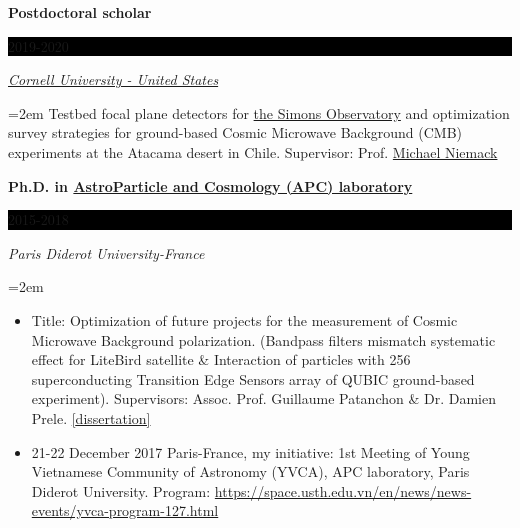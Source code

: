 \documentclass[paper=a4,fontsize=11pt]{scrartcl} %
\newcommand{\sepspace}{\vspace*{1em}}		%
\newcommand{\EducationEntry}[4]{
		\noindent \textbf{#1} \hfill      %
		\colorbox{Black}{%
			\parbox{6em}{%
			\hfill\color{White}#2}} \par  %
		\noindent \textit{#3} \par        %
		\noindent\hangindent=2em\hangafter=0 \small #4 %
		\normalsize \par}
\begin{document}
\sepspace


\EducationEntry{Postdoctoral scholar}{2019-2020}{ \href{https://www.cornell.edu/}{Cornell University - United States} }{ 
Testbed focal plane detectors for \href{https://simonsobservatory.org/}{the Simons Observatory} and optimization survey strategies for ground-based Cosmic Microwave Background (CMB) experiments at the Atacama desert in Chile. Supervisor: Prof. \href{https://www.classe.cornell.edu/~mdn49/}{Michael Niemack} }
\sepspace

\EducationEntry{Ph.D. in \href{http://www.apc.univ-paris7.fr/APC_CS/en}{AstroParticle and Cosmology (APC) laboratory} }{2015-2018}{Paris Diderot University-France}{
\begin{itemize}
    \item Title: Optimization of future projects for the measurement of Cosmic Microwave Background polarization. (Bandpass filters mismatch systematic effect for LiteBird satellite \& Interaction of particles with 256 superconducting Transition Edge Sensors array of QUBIC ground-based experiment). Supervisors: Assoc. Prof. Guillaume Patanchon \& Dr. Damien Prele. \href{http://theses.md.univ-paris-diderot.fr/HOANG_Duc_Thuong_1_Complete_20181217.pdf}{[{\color{blue}dissertation]} }
    \item 21-22 December 2017 Paris-France, my initiative: 1st Meeting of Young Vietnamese Community of Astronomy (YVCA), APC laboratory, Paris Diderot University. Program: {\color{blue} 
\href{https://space.usth.edu.vn/en/news/news-events/yvca-program-127.html}{https://space.usth.edu.vn/en/news/news-events/yvca-program-127.html} }
\end{itemize}
}
\sepspace

\end{document}
